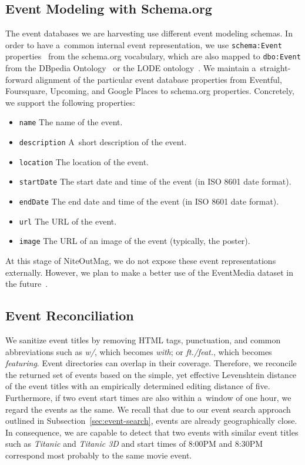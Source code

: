 \documentclass[runningheads,a4paper]{llncs}
\begin{document}
{\subsection{Event Modeling with Schema.org}                                 \label{sec:event-modeling}
The event databases we are harvesting use different event modeling schemas. In order to have a~common internal event representation, we use \texttt{schema:Event} properties~\cite{schemaorgevent} from the schema.org vocabulary, which are also mapped to \texttt{dbo:Event} from the DBpedia Ontology~\cite{dbpedia2schemaorg} or the LODE ontology~\cite{Shaw:ASWC09}. We maintain a~straight-forward alignment of the particular event database properties from Eventful, Foursquare, Upcoming, and Google Places to schema.org properties. Concretely, we support the following properties:
\begin{itemize}
  \item \texttt{name} The name of the event.
  \item \texttt{description} A~short description of the event.
  \item \texttt{location} The location of the event.
  \item \texttt{startDate} The start date and time of the event (in ISO 8601 date format).
  \item \texttt{endDate} The end date and time of the event (in ISO 8601 date format).
  \item \texttt{url} The URL of the event.
  \item \texttt{image} The URL of an image of the event (typically, the poster).
\end{itemize}
At this stage of NiteOutMag, we do not expose these event representations externally. However, we plan to make a better use of the EventMedia dataset in the future~\cite{Khrouf:SWJ12}.

\subsection{Event Reconciliation}                                           \label{sec:event-reconciliation}
We sanitize event titles by removing HTML tags, punctuation, and common abbreviations such as \emph{w/}, which becomes \emph{with}; or \emph{ft./feat.}, which becomes \emph{featuring}. Event directories can overlap in their coverage. Therefore, we reconcile the returned set of events based on the simple, yet effective Levenshtein distance of the event titles with an empirically determined editing distance of five. Furthermore, if two event start times are also within a~window of one hour, we regard the events as the same. We recall that due to our event search approach outlined in Subsection~\ref{sec:event-search}, events are already geographically close. In consequence, we are capable to detect that two events with similar event titles such as \emph{Titanic} and \emph{Titanic 3D} and start times of 8:00PM and 8:30PM correspond most probably to the same movie event.

}
\end{document}
